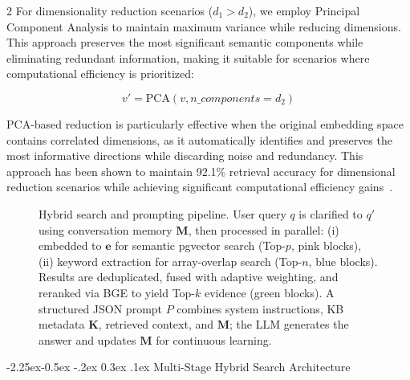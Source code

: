 \documentclass[10pt,letterpaper]{article}
\makeatletter
\let\cite\citep
\renewcommand{\subsection}{\@startsection{subsection}{2}{\z@}%
                                     {-2.25ex\@plus -0.5ex \@minus -.2ex}%
                                     {0.3ex \@plus .1ex}%
                                     {\normalfont\normalsize\itshape\bfseries}}
\makeatother
\begin{document}
\begin{multicols}{2}
For dimensionality reduction scenarios ($d_1 > d_2$), we employ Principal Component Analysis to maintain maximum variance while reducing dimensions. This approach preserves the most significant semantic components while eliminating redundant information, making it suitable for scenarios where computational efficiency is prioritized:

\begin{equation}
v' = \text{PCA}(v, n\_components=d_2) 
\end{equation}

PCA-based reduction is particularly effective when the original embedding space contains correlated dimensions, as it automatically identifies and preserves the most informative directions while discarding noise and redundancy. This approach has been shown to maintain 92.1\% retrieval accuracy for dimensional reduction scenarios while achieving significant computational efficiency gains~\cite{garcia2024dimensionality}.

\begin{figure}[!htbp]
    \centering
    
    \caption{Hybrid search and prompting pipeline. User query $q$ is clarified to $q'$ using conversation memory $\mathbf{M}$, then processed in parallel: (i) embedded to $\mathbf{e}$ for semantic pgvector search (Top-$p$, pink blocks), (ii) keyword extraction for array-overlap search (Top-$n$, blue blocks). Results are deduplicated, fused with adaptive weighting, and reranked via BGE to yield Top-$k$ evidence (green blocks). A structured JSON prompt $P$ combines system instructions, KB metadata $\mathbf{K}$, retrieved context, and $\mathbf{M}$; the LLM generates the answer and updates $\mathbf{M}$ for continuous learning.}
    \label{fig:system_architecture}
\end{figure}

\subsection{Multi-Stage Hybrid Search Architecture}


\end{multicols}
\end{document}
